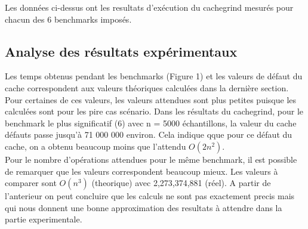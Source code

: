 \documentclass{article}
\begin{document}
   Les données ci-dessus ont les resultats d'exécution du cachegrind mesurés pour chacun des 6 benchmarks imposés. 
    
\subsection{Analyse des résultats expérimentaux}

Les temps obtenus pendant les benchmarks (Figure 1) et les valeurs de défaut du cache correspondent aux valeurs théoriques calculées dans la dernière section. Pour certaines de ces valeurs, les valeurs attendues sont plus petites puisque les calculées sont pour les pire cas scénario. Dans les résultats du cachegrind, pour le benchmark le plus significatif (6) avec n = 5000 échantillons, la valeur du cache défauts passe jusqu'à 71 000 000 environ. Cela indique qque pour ce défaut du cache, on a obtenu beaucoup moins que l'attendu $O(2n^2)$. \\

Pour le nombre d'opérations attendues pour le même benchmark, il est possible de remarquer que les valeurs correspondent beaucoup mieux. Les valeurs à comparer sont $O(n^3)$ (theorique) avec 2,273,374,881 (réel). A partir de l'anterieur on peut concluire que les calculs ne sont pas exactement precis mais qui nous donnent une bonne approximation des resultats à attendre dans la partie experimentale.  
\end{document}
